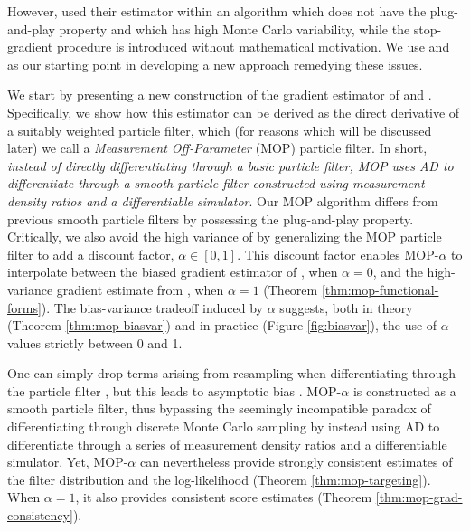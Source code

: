 \documentclass[9pt,twocolumn,pnasresearcharticle]{pnas-new}
\begin{document}
However, \cite{scibior21} used their estimator within an algorithm which does not have the plug-and-play property and which has high Monte Carlo variability, while the stop-gradient procedure is introduced without mathematical motivation.
We use \cite{scibior21} and \cite{poyiadjis11} as our starting point in developing a new approach remedying these issues.

We start by presenting a new construction of the gradient estimator of \cite{scibior21} and \cite{poyiadjis11}.
Specifically, we show how this estimator can be derived as the direct derivative of a suitably weighted particle filter, which (for reasons which will be discussed later) we call a {\it Measurement Off-Parameter} (MOP) particle filter. 
In short, \textit{instead of directly differentiating through a basic particle filter, MOP uses AD to differentiate through a smooth particle filter constructed using measurement density ratios and a differentiable simulator}. 
Our MOP algorithm differs from previous smooth particle filters \cite{svensson18,malik11} by possessing the plug-and-play property.
Critically, we also avoid the high variance of \cite{svensson18} by generalizing the MOP particle filter to add a discount factor, $\alpha \in [0,1]$.
This discount factor enables MOP-$\alpha$ to interpolate between the  biased gradient estimator of \cite{naesseth18}, when $\alpha=0$, and the high-variance gradient estimate from \cite{poyiadjis11, scibior21}, when $\alpha=1$ (Theorem \ref{thm:mop-functional-forms}).
The bias-variance tradeoff induced by $\alpha$ suggests, both in theory (Theorem \ref{thm:mop-biasvar}) and in practice (Figure \ref{fig:biasvar}), the use of $\alpha$ values strictly between 0 and 1.

One can simply drop terms arising from resampling when differentiating through the particle filter \cite{naesseth18}, but this leads to asymptotic bias \cite{corenflos21}.
MOP-$\alpha$ is constructed as a smooth particle filter, thus bypassing the seemingly incompatible paradox of differentiating through discrete Monte Carlo sampling by instead using AD to differentiate through a series of measurement density ratios and a differentiable simulator.
Yet, MOP-$\alpha$ can nevertheless provide strongly consistent estimates of the filter distribution and the log-likelihood (Theorem \ref{thm:mop-targeting}).
When $\alpha=1$, it also provides consistent score estimates (Theorem \ref{thm:mop-grad-consistency}).
\end{document}
